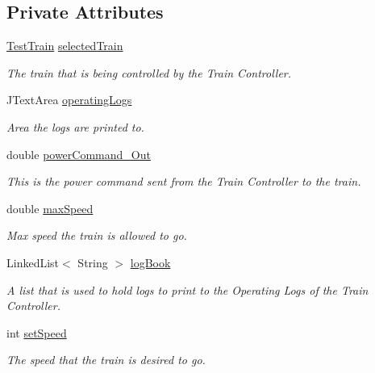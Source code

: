 \subsection*{Private Attributes}
\begin{DoxyCompactItemize}
\item 
\hyperlink{classTrainControllerComps_1_1TestTrain}{Test\+Train} \hyperlink{classTrainControllerComps_1_1TCSpeedController_ab8484141d0674b98f2b6d512dd190f5a}{selected\+Train}
\begin{DoxyCompactList}\small\item\em The train that is being controlled by the Train Controller. \end{DoxyCompactList}\item 
J\+Text\+Area \hyperlink{classTrainControllerComps_1_1TCSpeedController_a0cb92a0d707d38f6c2d82a40bb4dd853}{operating\+Logs}
\begin{DoxyCompactList}\small\item\em Area the logs are printed to. \end{DoxyCompactList}\item 
double \hyperlink{classTrainControllerComps_1_1TCSpeedController_a3ed394303d0d4f4c947dc2abcc6f18d3}{power\+Command\+\_\+\+Out}
\begin{DoxyCompactList}\small\item\em This is the power command sent from the Train Controller to the train. \end{DoxyCompactList}\item 
double \hyperlink{classTrainControllerComps_1_1TCSpeedController_abd22aed945ca95e2bd476cf9cc2abcbd}{max\+Speed}
\begin{DoxyCompactList}\small\item\em Max speed the train is allowed to go. \end{DoxyCompactList}\item 
Linked\+List$<$ String $>$ \hyperlink{classTrainControllerComps_1_1TCSpeedController_a1a4a076e7c917a5ddfe19d80b29cff62}{log\+Book}
\begin{DoxyCompactList}\small\item\em A list that is used to hold logs to print to the Operating Logs of the Train Controller. \end{DoxyCompactList}\item 
int \hyperlink{classTrainControllerComps_1_1TCSpeedController_a68f33f6aaf56d44c66e21b1acfe92ff4}{set\+Speed}
\begin{DoxyCompactList}\small\item\em The speed that the train is desired to go. \end{DoxyCompactList}\item 

\end{DoxyCompactItemize}
